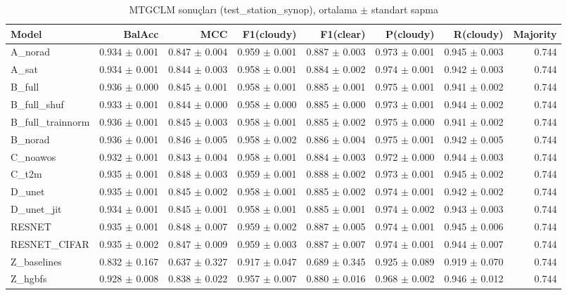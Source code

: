 \begin{table}[ht]
\centering
\caption{MTGCLM sonuçları (test_station_synop), ortalama $\pm$ standart sapma}
\label{tab:results_test_station_synop}
\begin{tabular}{lrrrrrrr}
\hline
Model & BalAcc & MCC & F1(cloudy) & F1(clear) & P(cloudy) & R(cloudy) & Majority \\
\hline
A\_norad & 0.934 $\pm$ 0.001 & 0.847 $\pm$ 0.004 & 0.959 $\pm$ 0.001 & 0.887 $\pm$ 0.003 & 0.973 $\pm$ 0.001 & 0.945 $\pm$ 0.003 & 0.744 \\
A\_sat & 0.934 $\pm$ 0.001 & 0.844 $\pm$ 0.003 & 0.958 $\pm$ 0.001 & 0.884 $\pm$ 0.002 & 0.974 $\pm$ 0.001 & 0.942 $\pm$ 0.003 & 0.744 \\
B\_full & 0.936 $\pm$ 0.000 & 0.845 $\pm$ 0.001 & 0.958 $\pm$ 0.001 & 0.885 $\pm$ 0.001 & 0.975 $\pm$ 0.001 & 0.941 $\pm$ 0.002 & 0.744 \\
B\_full\_shuf & 0.933 $\pm$ 0.001 & 0.844 $\pm$ 0.000 & 0.958 $\pm$ 0.000 & 0.885 $\pm$ 0.000 & 0.973 $\pm$ 0.001 & 0.944 $\pm$ 0.002 & 0.744 \\
B\_full\_trainnorm & 0.936 $\pm$ 0.001 & 0.845 $\pm$ 0.003 & 0.958 $\pm$ 0.001 & 0.885 $\pm$ 0.002 & 0.975 $\pm$ 0.000 & 0.941 $\pm$ 0.002 & 0.744 \\
B\_norad & 0.936 $\pm$ 0.001 & 0.846 $\pm$ 0.005 & 0.958 $\pm$ 0.002 & 0.886 $\pm$ 0.004 & 0.975 $\pm$ 0.001 & 0.942 $\pm$ 0.005 & 0.744 \\
C\_noawos & 0.932 $\pm$ 0.001 & 0.843 $\pm$ 0.004 & 0.958 $\pm$ 0.001 & 0.884 $\pm$ 0.003 & 0.972 $\pm$ 0.000 & 0.944 $\pm$ 0.003 & 0.744 \\
C\_t2m & 0.935 $\pm$ 0.001 & 0.848 $\pm$ 0.003 & 0.959 $\pm$ 0.001 & 0.888 $\pm$ 0.002 & 0.973 $\pm$ 0.001 & 0.945 $\pm$ 0.002 & 0.744 \\
D\_unet & 0.935 $\pm$ 0.001 & 0.845 $\pm$ 0.002 & 0.958 $\pm$ 0.001 & 0.885 $\pm$ 0.002 & 0.974 $\pm$ 0.001 & 0.942 $\pm$ 0.002 & 0.744 \\
D\_unet\_jit & 0.934 $\pm$ 0.001 & 0.845 $\pm$ 0.001 & 0.958 $\pm$ 0.001 & 0.885 $\pm$ 0.001 & 0.974 $\pm$ 0.002 & 0.943 $\pm$ 0.003 & 0.744 \\
RESNET & 0.935 $\pm$ 0.001 & 0.848 $\pm$ 0.007 & 0.959 $\pm$ 0.002 & 0.887 $\pm$ 0.005 & 0.974 $\pm$ 0.001 & 0.945 $\pm$ 0.006 & 0.744 \\
RESNET\_CIFAR & 0.935 $\pm$ 0.002 & 0.847 $\pm$ 0.009 & 0.959 $\pm$ 0.003 & 0.887 $\pm$ 0.007 & 0.974 $\pm$ 0.001 & 0.944 $\pm$ 0.007 & 0.744 \\
Z\_baselines & 0.832 $\pm$ 0.167 & 0.637 $\pm$ 0.327 & 0.917 $\pm$ 0.047 & 0.689 $\pm$ 0.345 & 0.925 $\pm$ 0.089 & 0.919 $\pm$ 0.070 & 0.744 \\
Z\_hgbfs & 0.928 $\pm$ 0.008 & 0.838 $\pm$ 0.022 & 0.957 $\pm$ 0.007 & 0.880 $\pm$ 0.016 & 0.968 $\pm$ 0.002 & 0.946 $\pm$ 0.012 & 0.744 \\
\hline
\end{tabular}
\end{table}

